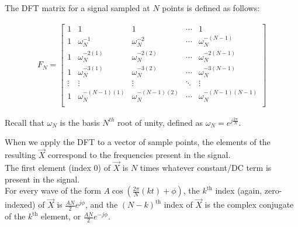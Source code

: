 

The DFT matrix for a signal sampled at $N$ points is defined as follows:

\begin{align*}
F_N =
\begin{bmatrix}
1 & 1 & 1 & \cdots & 1 \\
1 & \omega_N^{-1} & \omega_N^{-2} & \cdots & \omega_N^{-(N-1)} \\
1 & \omega_N^{-2(1)} & \omega_N^{-2(2)} & \cdots & \omega_N^{-2(N-1)} \\
1 & \omega_N^{-3(1)} & \omega_N^{-3(2)} & \cdots & \omega_N^{-3(N-1)} \\
\vdots & \vdots & \vdots  & \ddots & \vdots \\
1 & \omega_N^{-(N-1)(1)} & \omega_N^{-(N-1)(2)} & \cdots & \omega_N^{-(N-1)(N-1)} \\
\end{bmatrix}
\end{align*}

Recall that $\omega_N$ is the basis $N^{th}$ root of unity, defined as $\omega_N = e^{j\frac{2\pi}{N}}$.

\vspace{0.5em}
When we apply the DFT to a vector of sample points, the elements of the resulting $\vec{X}$ correspond to the frequencies present in the signal. \\
The first element (index 0) of $\vec{X}$ is $N$ times whatever constant/DC term is present in the signal. \\
For every wave of the form $A\cos(\frac{2\pi}{N}(kt) + \phi)$, the $k^{\text{th}}$ index (again, zero-indexed) of $\vec{X}$ is $\frac{AN}{2}e^{j\phi}$,
and the $(N - k)^{\text{th}}$ index of $\vec{X}$ is the complex conjugate of the $k^{\text{th}}$ element, or $\frac{AN}{2}e^{-j\phi}$.

